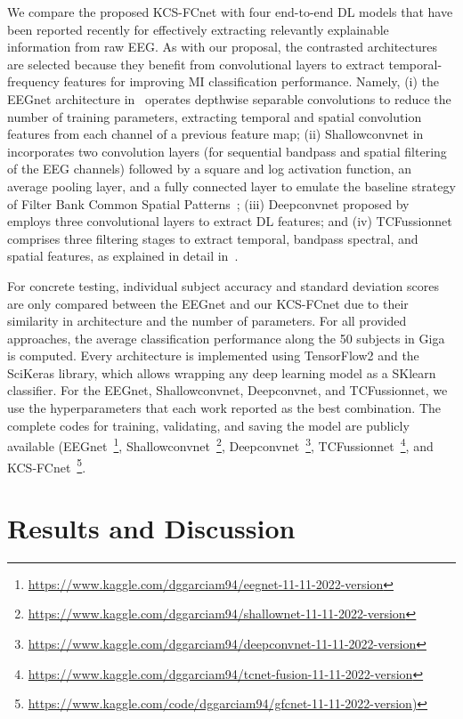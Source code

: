 	We compare the proposed KCS-FCnet with four end-to-end DL models that have been reported recently for effectively extracting relevantly explainable information from raw EEG. As with our proposal, the contrasted architectures are selected because they benefit from convolutional layers to extract temporal-frequency features for improving MI classification performance. Namely, (i) the EEGnet architecture in~\cite{lawhern2018eegnet} operates depthwise separable convolutions to reduce the number of training parameters, extracting temporal and spatial convolution features from each channel of a previous feature map; (ii) Shallowconvnet in~\cite{schirrmeister2017deep} incorporates two convolution layers (for sequential bandpass and spatial filtering of the EEG channels) followed by a square and log activation function, an average pooling layer, and a fully connected layer to emulate the baseline strategy of Filter Bank Common Spatial Patterns~\cite{ang2008filter}; (iii) Deepconvnet proposed by~\cite{schirrmeister2017deep} employs three convolutional layers to extract DL features; and (iv) TCFussionnet comprises three filtering stages to extract temporal, bandpass spectral, and spatial features, as explained in detail in~\cite{musallam2021electroencephalography}.
	
	For concrete testing, individual subject accuracy and standard deviation scores are only compared between the EEGnet and our KCS-FCnet due to their similarity in architecture and the number of parameters. For all provided approaches, the average classification performance along the 50 subjects in Giga is computed. Every architecture is implemented using TensorFlow2 and the SciKeras library, which allows wrapping any deep learning model as a SKlearn classifier. For the EEGnet, Shallowconvnet, Deepconvnet, and TCFussionnet, we use the hyperparameters that each work reported as the best combination. The complete codes for training, validating, and saving the model are publicly available (EEGnet~\footnote{\url{https://www.kaggle.com/dggarciam94/eegnet-11-11-2022-version}}, Shallowconvnet~\footnote{\url{https://www.kaggle.com/dggarciam94/shallownet-11-11-2022-version}}, Deepconvnet~\footnote{\url{https://www.kaggle.com/dggarciam94/deepconvnet-11-11-2022-version}}, TCFussionnet~\footnote{\url{https://www.kaggle.com/dggarciam94/tcnet-fusion-11-11-2022-version}}, and KCS-FCnet~\footnote{\url{https://www.kaggle.com/code/dggarciam94/gfcnet-11-11-2022-version)}}.

 \section{Results and Discussion}


